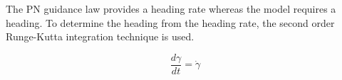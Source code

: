 \documentclass[conference]{IEEEtran}
\begin{document}
The PN guidance law provides a heading rate whereas the model requires a heading. To determine the heading from the heading rate, the second order Runge-Kutta integration technique is used. 

\begin{equation} \label{gamma}
\frac{d\gamma}{dt} = \dot{\gamma}
\end{equation}



\end{document}
